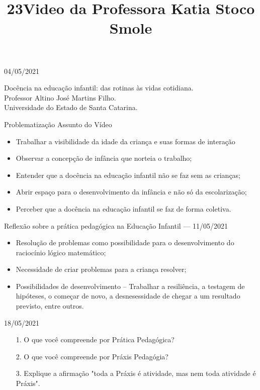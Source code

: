 \documentclass{SchoolBook}
\begin{document}
    \begin{day}{04/05/2021}
        \title{2}{
            Docência na educação infantil: das rotinas às vidas cotidiana. \\
            Professor Altino José Martins Filho. \\
            Universidade do Estado de Santa Catarina.
        }

        \title{3}{Problematização Assunto do Vídeo}

        \begin{itemize}[nosep]
            \item Trabalhar a visibilidade da idade da criança e suas formas de interação
            \item Observar a concepção de infância que norteia o trabalho;
            \item Entender que a docência na educação infantil não se faz sem as crianças;
            \item Abrir espaço para o desenvolvimento da infância e não só da escolarização;
            \item Perceber que a docência na educação infantil se faz de forma coletiva.
        \end{itemize}
    \end{day}
    
    \begin{day}{Reflexão sobre a prática pedagógica na Educação Infantil --- 11/05/2021}
        \title{Video da Professora Katia Stoco Smole}
        
        \begin{itemize}[nosep]
            \item Resolução de problemas como possibilidade para o desenvolvimento do raciocínio lógico matemático;
            \item Necessidade de criar problemas para a criança resolver;
            \item Possibilidades de desenvolvimento -- Trabalhar a resiliência, a testagem de hipóteses, o começar de novo, a desnesessidade de chegar a um resultado previsto, entre outros.
        \end{itemize}
    \end{day}
    
    \begin{day}{18/05/2021}
        \begin{enumerate}
            \item[1.] O que você compreende por Prática Pedagógica?
            
            \item[2.] O que você compreende por Práxis Pedagógia?
            \response{}
            
            \item[3.] Explique a afirmação "toda a Práxis é atividade, mas nem toda atividade é Práxis".
        \end{enumerate}
    \end{day}
    
\end{document}
